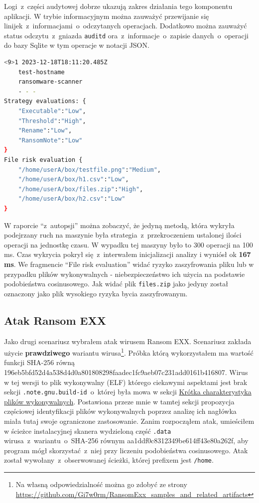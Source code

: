 Logi~z~części audytowej dobrze ukazują zakres działania tego komponentu aplikacji. W trybie informacyjnym można zauważyć przewijanie się linijek~z~informacjami~o~odczytanych operacjach. Dodatkowo można zauważyć status odczytu~z~gniazda \texttt{auditd} ora~z~informacje~o~zapisie danych~o~operacji do bazy Sqlite w tym operacje w notacji JSON.\newpage

\begin{lstlisting}[language=bash,
    backgroundcolor=\color{EEGold!5!white},
    caption={Raport wygenerowany ze skanera, który pozwoliłem sobie delikatnie sformatować aby widać było lepiej jego treść.},
    label={lst:raportau}]
    <9>1 2023-12-18T18:11:20.485Z
    test-hostname 
    ransomware-scanner 
    - - -  
Strategy evaluations: {
    "Executable":"Low",
    "Threshold":"High",
    "Rename":"Low",
    "RansomNote":"Low"
}
File risk evaluation {
    "/home/userA/box/testfile.png":"Medium",
    "/home/userA/box/h1.csv":"Low",
    "/home/userA/box/files.zip":"High",
    "/home/userA/box/h2.csv":"Low"
}
\end{lstlisting}
W raporcie \enquote{z~autopsji} można zobaczyć, że jedyną metodą, która wykryła podejrzany ruch na maszynie była strategia~z~przekroczeniem ustalonej ilości operacji na jednostkę czasu. W wypadku tej maszyny było to 300 operacji na 100 ms. 
Czas wykrycia pokrył się~z~interwałem inicjalizacji analizy i wyniósł ok \textbf{167 ms}.
\newline
We fragmencie \foreignquote{english}{File risk evaluation} widać ryzyko zaszyfrowania pliku lub w przypadku plików wykonywalnych - niebezpieczeństwo ich użycia na podstawie podobieństwa cosinusowego. Jak widać plik \texttt{files.zip} jako jedyny został oznaczony jako plik wysokiego ryzyka bycia zaszyfrowanym.

\subsection{Atak Ransom EXX}
Jako drugi scenariusz wybrałem atak wirusem Ransom EXX. Scenariusz zakłada użycie \textbf{prawdziwego} wariantu wirusa\footnote{Na własną odpowiedzialność można go zdobyć ze strony \url{https://github.com/Gi7w0rm/RansomExx_samples_and_related_artifacts}}. Próbka którą wykorzystałem ma wartość funkcji SHA-256 równą 196eb5bfd52d4a538d4d0a801808298faadec1fc9aeb07c231add0161b416807. Wirus w tej wersji to plik wykonywalny (ELF) którego ciekawymi aspektami jest brak sekcji \texttt{.note.gnu.build-id}~o~której była mowa w sekcji \hyperref[sec:elfini]{Krótka charakterystyka plików wykonywalnych}. Postawiona przeze mnie w tamtej sekcji propozycja częściowej identyfikacji plików wykonywalnych poprzez analizę ich nagłówka miała tutaj swoje ograniczone zastosowanie. Zanim rozpocząłem atak, umieściłem w ścieżce instalacyjnej skanera wydzieloną część \texttt{.data} wirusa~z~wariantu~o~SHA-256 równym aa1ddf0c8312349be614ff43e80a262f, aby program mógł skorzystać~z~niej przy liczeniu podobieństwa cosinusowego. Atak został wywołany~z~obserwowanej ścieżki, której prefixem jest \texttt{/home}.

